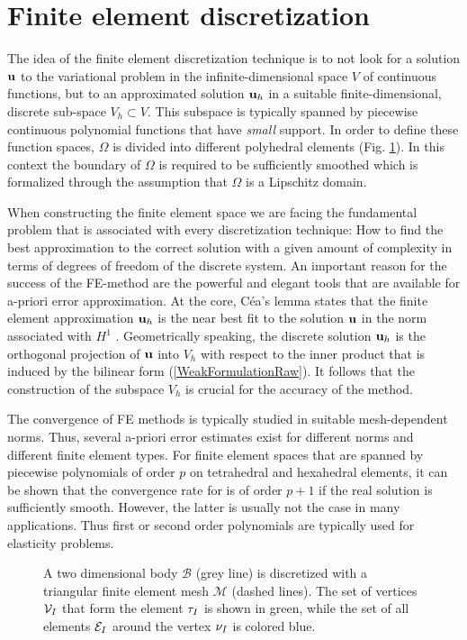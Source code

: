 \section{Finite element discretization}
\label{FEDiscretizationSection}
The idea of the finite element discretization technique is to not look for a solution $\mathbf {u} $ to the variational problem in the infinite-dimensional space $V$ of continuous functions, but to an approximated solution $\mathbf {u}  _h$ in a suitable finite-dimensional, discrete sub-space $V_h \subset V$. This subspace is typically spanned by piecewise continuous polynomial functions that have \emph{small} support. In order to define these function spaces, $\Omega$ is divided into different polyhedral elements (Fig. \ref{FEDiscretization}). In this context the boundary of $\Omega$ is required to be sufficiently smoothed which is formalized through the assumption that $\Omega$ is a Lipschitz domain. 

When constructing the finite element space we are facing the fundamental problem that is associated with every discretization technique: How to find the best approximation to the correct solution with a given amount of complexity in terms of degrees of freedom of the discrete system. An important reason for the success of the FE-method are the powerful and elegant tools that are available for a-priori error approximation. At the core, C\'{e}a's lemma states that the finite element approximation $\mathbf {u} _h$ is the near best fit to the solution $\mathbf {u} $ in the norm associated with $H^1$ \cite{Braess2007}. Geometrically speaking, the discrete solution $\mathbf {u} _h$ is the orthogonal projection of $\mathbf {u} $ into $V_h$ with respect to the inner product that is induced by the bilinear form (\ref{WeakFormulationRaw}). It follows that the construction of the subspace $V_h$ is crucial for the accuracy of the method.

The convergence of FE methods is typically studied in suitable mesh-dependent norms. Thus, several a-priori error estimates exist for different norms and different finite element types. For finite element spaces that are spanned by piecewise polynomials of order $p$ on tetrahedral and hexahedral elements, it can be shown that the convergence rate for is of order $p+1$ if the real solution is sufficiently smooth. However, the latter is usually not the case in many applications. Thus first or second order polynomials are typically used for elasticity problems.

\begin{figure}
   \centering   
	\caption{A two dimensional body $\mathcal B$ (grey line) is discretized with a triangular finite element mesh $\mathcal M$ (dashed lines). The set of vertices $\mathcal{V}_I$ that form the element $\tau_I$ is shown in green, while the set of all elements $\mathcal{E}_I$ around the vertex $\nu_I$ is colored blue.}
\label{FEDiscretization}
\end{figure}

